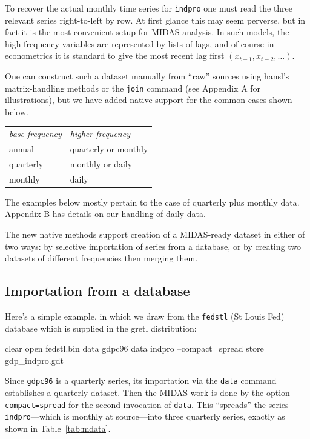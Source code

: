 \documentclass{article}
\begin{document}
To recover the actual monthly time series for \texttt{indpro} one must
read the three relevant series right-to-left by row. At first glance
this may seem perverse, but in fact it is the most convenient setup
for MIDAS analysis. In such models, the high-frequency variables are
represented by lists of lags, and of course in econometrics it is
standard to give the most recent lag first
$(x_{t-1}, x_{t-2}, \ldots)$.

One can construct such a dataset manually from ``raw'' sources using
hansl's matrix-handling methods or the \texttt{join} command (see
Appendix A for illustrations), but we have added native support for
the common cases shown below.

\begin{center}
\begin{tabular}{ll}
\textit{base frequency} & \textit{higher frequency} \\[4pt]
annual    & quarterly or monthly \\
quarterly & monthly or daily \\
monthly   & daily
\end{tabular}
\end{center}

The examples below mostly pertain to the case of quarterly plus
monthly data. Appendix B has details on our handling of daily data.

The new native methods support creation of a MIDAS-ready dataset in
either of two ways: by selective importation of series from a
database, or by creating two datasets of different frequencies then
merging them.

\subsection{Importation from a database}
\label{sec:db-import}

Here's a simple example, in which we draw from the \texttt{fedstl} (St
Louis Fed) database which is supplied in the gretl distribution:
\begin{code}
clear
open fedstl.bin
data gdpc96
data indpro --compact=spread
store gdp_indpro.gdt
\end{code}

Since \texttt{gdpc96} is a quarterly series, its importation via the
\texttt{data} command establishes a quarterly dataset. Then the
MIDAS work is done by the option \verb|--compact=spread| for the
second invocation of \texttt{data}. This ``spreads'' the series
\texttt{indpro}---which is monthly at source---into three quarterly
series, exactly as shown in Table~\ref{tab:mdata}.
\end{document}
